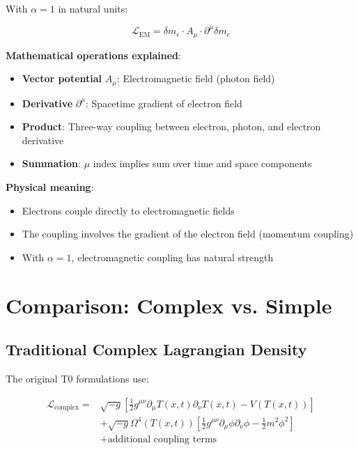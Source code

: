 \documentclass[12pt,a4paper]{article}
\newcommand{\Tfield}{T(x,t)}
\newcommand{\deltam}{\delta m}
\newcommand{\Lag}{\mathcal{L}}
\theoremstyle{definition}
\theoremstyle{remark}
\begin{document}
	With $\alpha = 1$ in natural units:
	
	\begin{equation}
		\Lag_{\text{EM}} = \deltam_e \cdot A_\mu \cdot \partial^\mu \deltam_e
		\label{eq:em_interaction}
	\end{equation}
	
	\textbf{Mathematical operations explained}:
	\begin{itemize}
		\item \textbf{Vector potential} $A_\mu$: Electromagnetic field (photon field)
		\item \textbf{Derivative} $\partial^\mu$: Spacetime gradient of electron field
		\item \textbf{Product}: Three-way coupling between electron, photon, and electron derivative
		\item \textbf{Summation}: $\mu$ index implies sum over time and space components
	\end{itemize}
	
	\textbf{Physical meaning}:
	\begin{itemize}
		\item Electrons couple directly to electromagnetic fields
		\item The coupling involves the gradient of the electron field (momentum coupling)
		\item With $\alpha = 1$, electromagnetic coupling has natural strength
	\end{itemize}
	
	\section{Comparison: Complex vs. Simple}
	
	\subsection{Traditional Complex Lagrangian Density}
	
	The original T0 formulations use:
	
	\begin{align}
		\Lag_{\text{complex}} = &\sqrt{-g} \left[\frac{1}{2} g^{\mu\nu} \partial_\mu \Tfield \partial_\nu \Tfield - V(\Tfield)\right] \\
		&+ \sqrt{-g} \Omega^4(\Tfield) \left[\frac{1}{2} g^{\mu\nu} \partial_\mu \phi \partial_\nu \phi - \frac{1}{2} m^2 \phi^2\right] \\
		&+ \text{additional coupling terms}
	\end{align}
	
\end{document}
